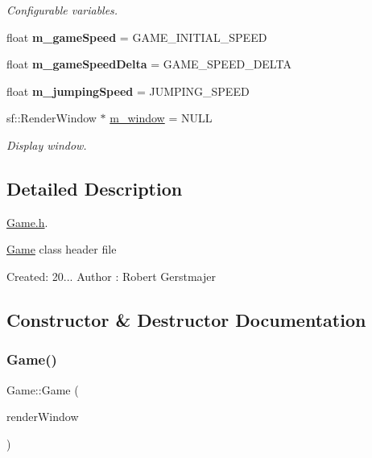 \begin{DoxyCompactItemize}
\begin{DoxyCompactList}\small\item\em Configurable variables. \end{DoxyCompactList}\item 
\mbox{\label{class_game_a8adc590508c4a6e7d2c8ce15f2fa161f}} 
float {\bfseries m\+\_\+game\+Speed} = G\+A\+M\+E\+\_\+\+I\+N\+I\+T\+I\+A\+L\+\_\+\+S\+P\+E\+ED
\item 
\mbox{\label{class_game_a1af039f161a1a990c1e89656ba7b395d}} 
float {\bfseries m\+\_\+game\+Speed\+Delta} = G\+A\+M\+E\+\_\+\+S\+P\+E\+E\+D\+\_\+\+D\+E\+L\+TA
\item 
\mbox{\label{class_game_aa1896e45ea2e038e4bda938b2e74995f}} 
float {\bfseries m\+\_\+jumping\+Speed} = J\+U\+M\+P\+I\+N\+G\+\_\+\+S\+P\+E\+ED
\item 
\mbox{\label{class_game_aa1aa5d5c0048064e80f7b7684a323d32}} 
sf\+::\+Render\+Window $\ast$ \mbox{\hyperlink{class_game_aa1aa5d5c0048064e80f7b7684a323d32}{m\+\_\+window}} = N\+U\+LL
\begin{DoxyCompactList}\small\item\em Display window. \end{DoxyCompactList}\end{DoxyCompactItemize}


\subsection{Detailed Description}
\mbox{\hyperlink{_game_8h_source}{Game.\+h}}. 

\mbox{\hyperlink{class_game}{Game}} class header file

Created\+: 20... Author \+: Robert Gerstmajer 

\subsection{Constructor \& Destructor Documentation}
\mbox{\label{class_game_acfc33e4d3763b99843261d6f9c0a192c}} 
\subsubsection{\texorpdfstring{Game()}{Game()}}
{\footnotesize\ttfamily Game\+::\+Game (\begin{DoxyParamCaption}\item[{sf\+::\+Render\+Window $\ast$}]{render\+Window }\end{DoxyParamCaption})}

